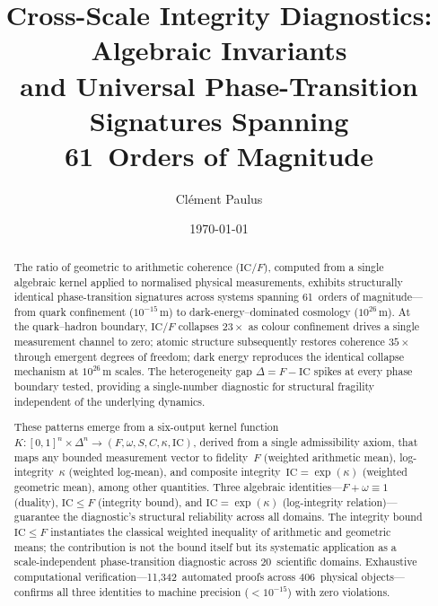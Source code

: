 \documentclass[
  aps,
  prx,
  twocolumn,
  superscriptaddress,
  nofootinbib,
  floatfix
]{revtex4-2}
\newcommand{\IC}{\mathrm{IC}}
\begin{document}
\title{Cross-Scale Integrity Diagnostics: Algebraic Invariants\\
and Universal Phase-Transition Signatures Spanning\\
61~Orders of Magnitude}

\author{Cl\'{e}ment Paulus}

\date{\today}

\begin{abstract}
The ratio of geometric to arithmetic coherence ($\IC/F$), computed
from a single algebraic kernel applied to normalised physical
measurements, exhibits structurally identical phase-transition
signatures across systems spanning 61~orders of magnitude---from
quark confinement ($10^{-15}$\,m) to dark-energy--dominated cosmology
($10^{26}$\,m). At the quark--hadron boundary, $\IC/F$ collapses
$23\times$ as colour confinement drives a single measurement channel
to zero; atomic structure subsequently restores coherence
$35\times$ through emergent degrees of freedom; dark energy
reproduces the identical collapse mechanism at $10^{26}$\,m scales.
The heterogeneity gap $\Delta = F - \IC$ spikes at every phase
boundary tested, providing a single-number diagnostic for structural
fragility independent of the underlying dynamics.

These patterns emerge from a six-output kernel function
$K\!:\![0,1]^n \times \Delta^n \to (F, \omega, S, C, \kappa, \IC)$,
derived from a single admissibility axiom, that maps any bounded
measurement vector to fidelity~$F$ (weighted arithmetic mean),
log-integrity~$\kappa$ (weighted log-mean), and composite
integrity~$\IC = \exp(\kappa)$ (weighted geometric mean), among
other quantities. Three algebraic identities---$F + \omega \equiv 1$
(duality), $\IC \leq F$ (integrity bound), and
$\IC = \exp(\kappa)$ (log-integrity relation)---guarantee the
diagnostic's structural reliability across all domains.
The integrity bound $\IC \leq F$ instantiates the classical weighted
inequality of arithmetic and geometric means; the contribution is
not the bound itself but its systematic application as a
scale-independent phase-transition diagnostic across 20~scientific
domains. Exhaustive computational verification---11{,}342~automated
proofs across 406~physical objects---confirms all three identities
to machine precision ($<\!10^{-15}$) with zero violations.
\end{abstract}
\end{document}
